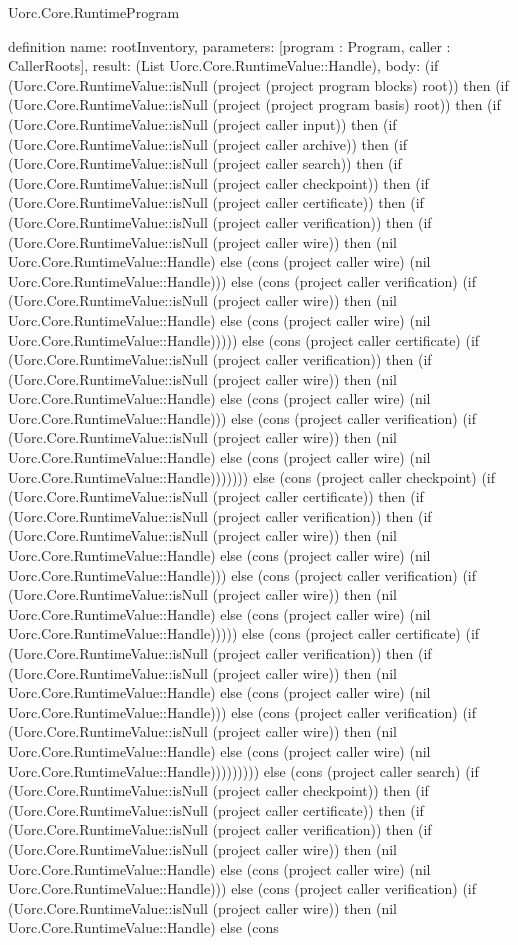 \begin{lexlean}{Uorc.Core.RuntimeProgram}
\begin{semanticmodule}
definition{
  name: rootInventory,
  parameters: [program : Program, caller : CallerRoots],
  result: (List Uorc.Core.RuntimeValue::Handle),
  body: (if (Uorc.Core.RuntimeValue::isNull (project (project program blocks) root)) then (if (Uorc.Core.RuntimeValue::isNull (project (project program basis) root)) then (if (Uorc.Core.RuntimeValue::isNull (project caller input)) then (if (Uorc.Core.RuntimeValue::isNull (project caller archive)) then (if (Uorc.Core.RuntimeValue::isNull (project caller search)) then (if (Uorc.Core.RuntimeValue::isNull (project caller checkpoint)) then (if (Uorc.Core.RuntimeValue::isNull (project caller certificate)) then (if (Uorc.Core.RuntimeValue::isNull (project caller verification)) then (if (Uorc.Core.RuntimeValue::isNull (project caller wire)) then (nil Uorc.Core.RuntimeValue::Handle) else (cons (project caller wire) (nil Uorc.Core.RuntimeValue::Handle))) else (cons (project caller verification) (if (Uorc.Core.RuntimeValue::isNull (project caller wire)) then (nil Uorc.Core.RuntimeValue::Handle) else (cons (project caller wire) (nil Uorc.Core.RuntimeValue::Handle))))) else (cons (project caller certificate) (if (Uorc.Core.RuntimeValue::isNull (project caller verification)) then (if (Uorc.Core.RuntimeValue::isNull (project caller wire)) then (nil Uorc.Core.RuntimeValue::Handle) else (cons (project caller wire) (nil Uorc.Core.RuntimeValue::Handle))) else (cons (project caller verification) (if (Uorc.Core.RuntimeValue::isNull (project caller wire)) then (nil Uorc.Core.RuntimeValue::Handle) else (cons (project caller wire) (nil Uorc.Core.RuntimeValue::Handle))))))) else (cons (project caller checkpoint) (if (Uorc.Core.RuntimeValue::isNull (project caller certificate)) then (if (Uorc.Core.RuntimeValue::isNull (project caller verification)) then (if (Uorc.Core.RuntimeValue::isNull (project caller wire)) then (nil Uorc.Core.RuntimeValue::Handle) else (cons (project caller wire) (nil Uorc.Core.RuntimeValue::Handle))) else (cons (project caller verification) (if (Uorc.Core.RuntimeValue::isNull (project caller wire)) then (nil Uorc.Core.RuntimeValue::Handle) else (cons (project caller wire) (nil Uorc.Core.RuntimeValue::Handle))))) else (cons (project caller certificate) (if (Uorc.Core.RuntimeValue::isNull (project caller verification)) then (if (Uorc.Core.RuntimeValue::isNull (project caller wire)) then (nil Uorc.Core.RuntimeValue::Handle) else (cons (project caller wire) (nil Uorc.Core.RuntimeValue::Handle))) else (cons (project caller verification) (if (Uorc.Core.RuntimeValue::isNull (project caller wire)) then (nil Uorc.Core.RuntimeValue::Handle) else (cons (project caller wire) (nil Uorc.Core.RuntimeValue::Handle))))))))) else (cons (project caller search) (if (Uorc.Core.RuntimeValue::isNull (project caller checkpoint)) then (if (Uorc.Core.RuntimeValue::isNull (project caller certificate)) then (if (Uorc.Core.RuntimeValue::isNull (project caller verification)) then (if (Uorc.Core.RuntimeValue::isNull (project caller wire)) then (nil Uorc.Core.RuntimeValue::Handle) else (cons (project caller wire) (nil Uorc.Core.RuntimeValue::Handle))) else (cons (project caller verification) (if (Uorc.Core.RuntimeValue::isNull (project caller wire)) then (nil Uorc.Core.RuntimeValue::Handle) else (cons }
\end{semanticmodule}
\end{lexlean}
